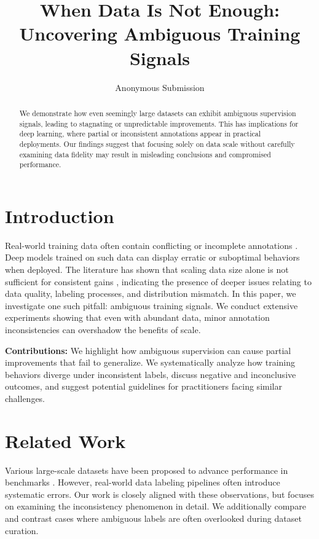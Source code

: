 \documentclass{article}
\title{When Data Is Not Enough: Uncovering Ambiguous Training Signals}
\author{Anonymous Submission}
\date{}
\begin{document}
\maketitle

\begin{abstract}
We demonstrate how even seemingly large datasets can exhibit ambiguous supervision signals, leading to stagnating or unpredictable improvements. This has implications for deep learning, where partial or inconsistent annotations appear in practical deployments. Our findings suggest that focusing solely on data scale without carefully examining data fidelity may result in misleading conclusions and compromised performance.
\end{abstract}

\section{Introduction}
Real-world training data often contain conflicting or incomplete annotations \citep{goodfellow2015explaining}. Deep models trained on such data can display erratic or suboptimal behaviors when deployed. The literature has shown that scaling data size alone is not sufficient for consistent gains \citep{lecun2015deep}, indicating the presence of deeper issues relating to data quality, labeling processes, and distribution mismatch. In this paper, we investigate one such pitfall: ambiguous training signals. We conduct extensive experiments showing that even with abundant data, minor annotation inconsistencies can overshadow the benefits of scale.

\textbf{Contributions:} We highlight how ambiguous supervision can cause partial improvements that fail to generalize. We systematically analyze how training behaviors diverge under inconsistent labels, discuss negative and inconclusive outcomes, and suggest potential guidelines for practitioners facing similar challenges.

\section{Related Work}
Various large-scale datasets have been proposed to advance performance in benchmarks \citep{goodfellow2015explaining,lecun2015deep}. However, real-world data labeling pipelines often introduce systematic errors. Our work is closely aligned with these observations, but focuses on examining the inconsistency phenomenon in detail. We additionally compare and contrast cases where ambiguous labels are often overlooked during dataset curation.
\end{document}

